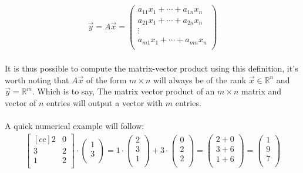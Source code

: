 \documentclass[11pt, a4paper]{article}
\begin{document}
\begin{align*}
  \vec{y} = A\vec{x} =
  \begin{pmatrix}
    a_{11}x_1 + \cdots + a_{1n}x_n\\
    a_{21}x_1 + \cdots + a_{2n}x_n\\
    \vdots\\
    a_{m1}x_1 + \cdots + a_{mn}x_n\\
  \end{pmatrix}
\end{align*}
\\
It is thus possible to compute the matrix-vector product using this definition, it's worth noting that
$A\vec{x}$ of the form $m \times n$ will always be of the rank $\vec{x} \in \mathbb{R}^n$ and 
$\vec{y} = \mathbb{R}^m$. Which is to say, The matrix vector product of an $m \times n$ 
matrix and vector of $n$ entries will output
a vector with $m$ entries.\\
\\
A quick numerical example will follow:
\begin{align*}
  \begin{bmatrix}[cc]
    2 & 0\\
    3 & 2\\
    1 & 2\\
  \end{bmatrix}
  \cdot
  \begin{pmatrix}
    1\\
    3\\
  \end{pmatrix}
  =
  1 \cdot \begin{pmatrix} 2\\ 3\\ 1\\ \end{pmatrix} +
  3 \cdot \begin{pmatrix} 0\\ 2 \\ 2\\ \end{pmatrix} =
    \begin{pmatrix} 2+0\\ 3+6\\ 1+6\\ \end{pmatrix}
  =
  \begin{pmatrix} 1\\ 9\\ 7\\ \end{pmatrix}
\end{align*}
\end{document}
